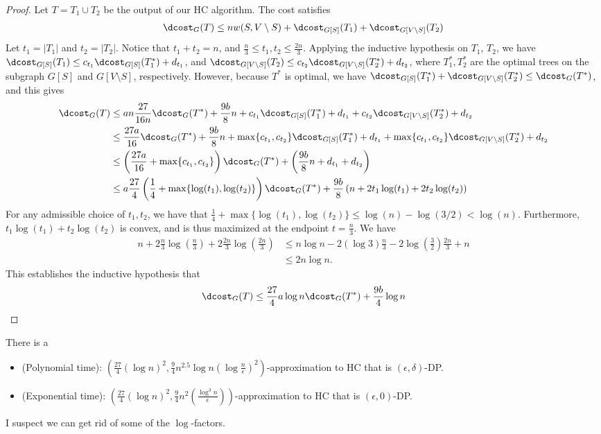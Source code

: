 \begin{proof}
Let $T = T_1 \cup T_2$ be the output of our HC algorithm. The cost satisfies
\begin{align*}
    \dcost_G(T) \leq n w(S, V \setminus S) + \dcost_{G[S]}(T_1) + \dcost_{G[V \setminus S]}(T_2)
\end{align*}
Let $t_1 = |T_1|$ and $t_2 = |T_2|$. Notice that $t_1 + t_2 = n$, and $\frac{n}{3} \leq t_1, t_2 \leq \frac{2n}{3}$.
Applying the inductive hypothesis on $T_1$, $T_2$, we have 
$\dcost_{G[S]}(T_1) \leq c_{t_1}\dcost_{G[S]}(T_1^*) + d_{t_1}$, and $\dcost_{G[V \setminus S]}(T_2) \leq c_{t_2}\dcost_{G[V \setminus S]}(T_2^*) + d_{t_2}$, where $T_1^*, T_2^*$ are the optimal trees on the subgraph $G[S]$ and $G[V \setminus S]$, respectively. However, because $T^*$ is optimal, we have $\dcost_{G[S]}(T_1^*) + \dcost_{G[V \setminus S]}(T_2^*) \leq \dcost_G(T^*)$, and this gives
\begin{align*}
    \dcost_G(T) &\leq a n\frac{27}{16n}\dcost_G(T^*) + \frac{9b}{8}n + c_{t_1} \dcost_{G[S]}(T_1^*) + d_{t_1} + c_{t_2}\dcost_{G[V \setminus S]}(T_2^*) + d_{t_2} \\
    &\leq \frac{27a}{16} \dcost_G(T^*) + \frac{9b}{8}n + \max\{c_{t_1}, c_{t_2}\} \dcost_{G[S]}(T^*_1) + d_{t_1} + \max\{c_{t_1}, c_{t_2}\}\dcost_{G[V \setminus S]}(T^*_2) + d_{t_2} \\
    &\leq \left(\frac{27a}{16} + \max\{ c_{t_1}, c_{t_2}\} \right) \dcost_G(T^*) + \left(\frac{9b}{8}n + d_{t_1} + d_{t_2}\right) \\
    &\leq a\frac{27}{4}\left(\frac{1}{4} + \max\{ \log(t_1), \log(t_2)\} \right) \dcost_G(T^*) + \frac{9b}{8}\left(n + 2t_1\log(t_1) + 2t_2 \log(t_2) \right)
\end{align*}
For any admissible choice of $t_1, t_2$, we have that $\frac{1}{4} + \max\{ \log(t_1), \log(t_2)\} \leq \log(n) - \log(3/2) < \log(n)$. Furthermore, $t_1 \log(t_1) + t_2 \log (t_2)$ is convex, and is thus maximized at the endpoint $t = \frac{n}{3}$. We have 
\begin{align*}
    n + 2\frac{n}{3} \log(\frac{n}{3}) + 2\frac{2n}{3} \log (\frac{2n}{3}) &\leq n \log n - 2(\log 3) \frac{n}{3} - 2\log (\frac{3}{2}) \frac{2n}{3} + n \\
    &\leq 2n \log n.
\end{align*}
This establishes the inductive hypothesis that
\[
    \dcost_G(T) \leq \frac{27}{4}a \log n \dcost_G(T^*) + \frac{9b}{4}\log n \\
\]
\end{proof}

\begin{coro}
    There is a 
    \begin{itemize}
        \item (Polynomial time): $(\frac{27}{4} (\log n)^2, \frac{9}{4}n^{2.5} \log n(\log \frac{n}{\epsilon})^2)$-approximation to HC that is $(\epsilon, \delta)$-DP.
        \item (Exponential time): $(\frac{27}{4} (\log n)^2, \frac{9}{4}n^2 (\frac{\log^3 n}{\epsilon}))$-approximation to HC that is $(\epsilon, 0)$-DP.
    \end{itemize}
\end{coro}
I suspect we can get rid of some of the $\log$-factors.

